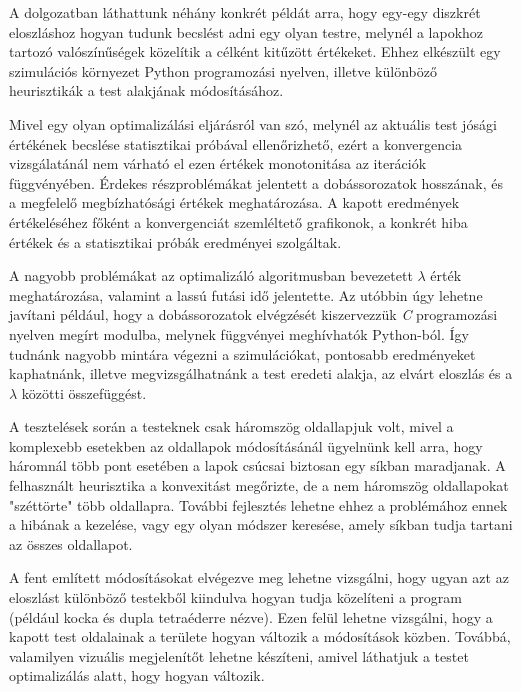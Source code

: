 
A dolgozatban láthattunk néhány konkrét példát arra, hogy egy-egy diszkrét eloszláshoz hogyan tudunk becslést adni egy olyan testre, melynél a lapokhoz tartozó valószínűségek közelítik a célként kitűzött értékeket. Ehhez elkészült egy szimulációs környezet Python programozási nyelven, illetve különböző heurisztikák a test alakjának módosításához.


Mivel egy olyan optimalizálási eljárásról van szó, melynél az aktuális test jósági értékének becslése statisztikai próbával ellenőrizhető, ezért a konvergencia vizsgálatánál nem várható el ezen értékek monotonitása az iterációk függvényében. Érdekes részproblémákat jelentett a dobássorozatok hosszának, és a megfelelő megbízhatósági értékek meghatározása.
A kapott eredmények értékeléséhez főként a konvergenciát szemléltető grafikonok, a konkrét hiba értékek és a statisztikai próbák eredményei szolgáltak.

A nagyobb problémákat az optimalizáló algoritmusban bevezetett $\lambda$ érték meghatározása, valamint a lassú futási idő jelentette.
Az utóbbin úgy lehetne javítani például, hogy a dobássorozatok elvégzését kiszervezzük \textit{C} programozási nyelven megírt modulba, melynek függvényei meghívhatók Python-ból.
Így tudnánk nagyobb mintára végezni a szimulációkat, pontosabb eredményeket kaphatnánk, illetve megvizsgálhatnánk a test eredeti alakja, az elvárt eloszlás és a $\lambda$ közötti összefüggést.

A tesztelések során a testeknek csak háromszög oldallapjuk volt, mivel a komplexebb esetekben az oldallapok módosításánál ügyelnünk kell arra, hogy háromnál több pont esetében a lapok csúcsai biztosan egy síkban maradjanak.
A felhasznált heurisztika a konvexitást megőrizte, de a nem háromszög oldallapokat "széttörte" több oldallapra.
További fejlesztés lehetne ehhez a problémához ennek a hibának a kezelése, vagy egy olyan módszer keresése, amely síkban tudja tartani az összes oldallapot.

A fent említett módosításokat elvégezve meg lehetne vizsgálni, hogy ugyan azt az eloszlást különböző testekből kiindulva hogyan tudja közelíteni a program (például kocka és dupla tetraéderre nézve).
Ezen felül lehetne vizsgálni, hogy a kapott test oldalainak a területe hogyan változik a módosítások közben.
Továbbá, valamilyen vizuális megjelenítőt lehetne készíteni, amivel láthatjuk a testet optimalizálás alatt, hogy hogyan változik.

